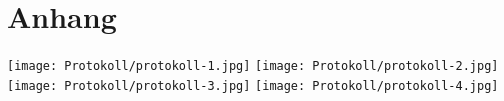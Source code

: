 \section{Anhang}

\appendix

\texttt{[image: Protokoll/protokoll-1.jpg]}
\texttt{[image: Protokoll/protokoll-2.jpg]}
\texttt{[image: Protokoll/protokoll-3.jpg]}
\texttt{[image: Protokoll/protokoll-4.jpg]}